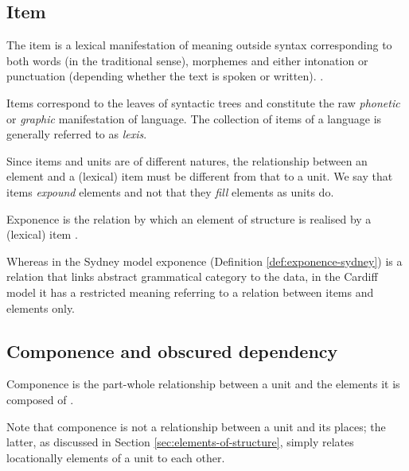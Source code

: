 \subsection{Item}
    \begin{definition}[Item]\label{def:item}
    	The item is a lexical manifestation of meaning outside syntax corresponding to both words (in the traditional sense), morphemes and either intonation or punctuation (depending whether the text is spoken or written). \citep[226--232]{Fawcett2000}. 
    \end{definition}
    
    Items correspond to the leaves of syntactic trees and constitute the raw \textit{phonetic} or \textit{graphic} manifestation of language. The collection of items of a language is generally referred to as \textit{lexis}.
    
    Since items and units are of different natures, the relationship between an element and a (lexical) item must be different from that to a unit. We say that items \textit{expound} elements and not that they \textit{fill} elements as units do. 
    
    \begin{definition}\label{def:exponence}
        Exponence is the relation by which an element of structure is realised by a (lexical) item \citep[254]{Fawcett2000}. 
    \end{definition}
    
    Whereas in the Sydney model exponence (Definition \ref{def:exponence-sydney}) is a relation that links abstract grammatical category to the data, in the Cardiff model it has a restricted meaning referring to a relation between items and elements only. 

\subsection{Componence and obscured dependency}
\label{sec:componence}
    
    \begin{definition}[Componence]\label{def:componence}
        Componence is the part-whole relationship between a unit and the elements it is composed of \citep[244]{Fawcett2000}. 
    \end{definition}
    
    Note that componence is not a relationship between a unit and its places; the latter, as discussed in Section \ref{sec:elements-of-structure}, simply relates locationally elements of a unit to each other.
    
